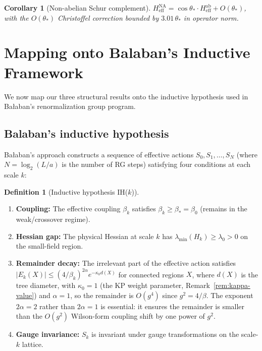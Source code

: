 \documentclass[11pt]{article}
\newtheorem{corollary}[theorem]{Corollary}
\theoremstyle{definition}
\newtheorem{definition}[theorem]{Definition}
\begin{document}
\begin{corollary}[Non-abelian Schur complement]\label{cor:NAschur}
$H_{\mathrm{eff}}^{\mathrm{NA}}=\cos\theta_*\cdot
H_{\mathrm{eff}}^{\mathrm{ab}}+O(\theta_*)$, with the
$O(\theta_*)$ Christoffel correction bounded by
$3.01\,\theta_*$ in operator norm.
\end{corollary}



\section{Mapping onto Balaban's Inductive Framework}\label{sec:roadmap}

We now map our three structural results onto the inductive hypothesis
used in Ba\l aban's renormalization group program.

\subsection{Balaban's inductive hypothesis}

Ba\l aban's approach constructs a sequence of effective actions
$S_0,S_1,\ldots,S_N$ (where $N=\log_2(L/a)$ is the number of RG steps)
satisfying four conditions at each scale $k$:

\begin{definition}[Inductive hypothesis IH($k$)]\label{def:IH}
\begin{enumerate}[nosep,label=(IH\arabic*)]
\item \textbf{Coupling:}
The effective coupling $\beta_k$ satisfies $\beta_k\ge\beta_*=\beta_0$ (remains
in the weak/crossover regime).
\item \textbf{Hessian gap:}
The physical Hessian at scale $k$ has
$\lambda_{\min}(H_k)\ge\lambda_0>0$ on the small-field region.
\item \textbf{Remainder decay:}
The irrelevant part of the effective action satisfies
$|E_k(X)|\le(4/\beta_k)^{2\alpha}e^{-\kappa_0 d(X)}$ for connected
regions $X$, where $d(X)$ is the tree diameter, with $\kappa_0=1$ (the KP weight parameter,
Remark~\ref{rem:kappa-value}) and $\alpha=1$,
so the remainder is $O(g^4)$ since $g^2=4/\beta$.
The exponent $2\alpha=2$ rather than $2\alpha=1$
is essential: it ensures the remainder is smaller than the
$O(g^2)$ Wilson-form coupling shift by one power of $g^2$.
\item \textbf{Gauge invariance:}
$S_k$ is invariant under gauge transformations on the scale-$k$ lattice.
\end{enumerate}
\end{definition}
\end{document}
